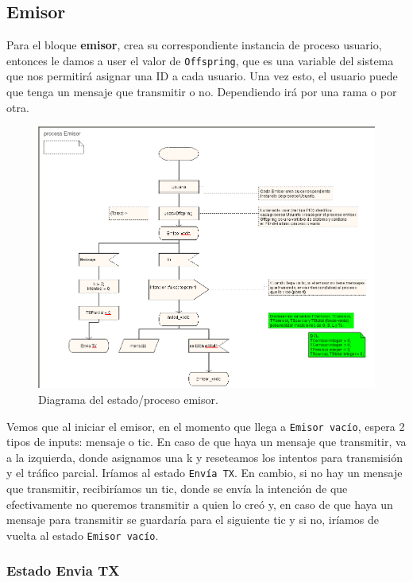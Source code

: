 \documentclass{article}
\begin{document}
\quad

\subsection{Emisor}

Para el bloque \textbf{emisor}, crea su correspondiente instancia de proceso usuario, entonces le damos a user el valor de \verb|Offspring|,  que es una variable del sistema que nos permitirá asignar una ID a cada usuario. Una vez esto, el usuario puede que tenga un mensaje que transmitir o no. Dependiendo irá por una rama o por otra. 

\begin{figure}[h]
    \centering
    \includegraphics[width=0.8\linewidth]{src/Estado emisor.png}
    \caption{\label{fig:emisorbl} Diagrama del estado/proceso emisor.}
\end{figure}

Vemos que al iniciar el emisor, en el momento que llega a \verb|Emisor vacío|, espera 2 tipos de inputs: mensaje o tic. En caso de que haya un mensaje que transmitir, va a la izquierda, donde asignamos una k y reseteamos los intentos para transmisión y el tráfico parcial. Iríamos al estado \verb|Envía TX|. En cambio, si no hay un mensaje que transmitir, recibiríamos un tic, donde se envía la intención de que efectivamente no queremos transmitir a quien lo creó y, en caso de que haya un mensaje para transmitir se guardaría para el siguiente tic y si no, iríamos de vuelta al estado \verb|Emisor vacío|. 

\subsubsection{Estado Envia TX}
\end{document}
